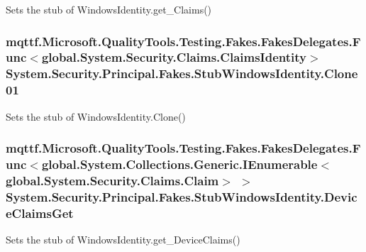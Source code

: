 Sets the stub of Windows\-Identity.\-get\-\_\-\-Claims()

\hypertarget{class_system_1_1_security_1_1_principal_1_1_fakes_1_1_stub_windows_identity_ac09e81aa53837049871a8ca89b96f598}{
\subsubsection[{Clone01}]{\setlength{\rightskip}{0pt plus 5cm}mqttf.\-Microsoft.\-Quality\-Tools.\-Testing.\-Fakes.\-Fakes\-Delegates.\-Func$<$global.\-System.\-Security.\-Claims.\-Claims\-Identity$>$ System.\-Security.\-Principal.\-Fakes.\-Stub\-Windows\-Identity.\-Clone01}}\label{class_system_1_1_security_1_1_principal_1_1_fakes_1_1_stub_windows_identity_ac09e81aa53837049871a8ca89b96f598}


Sets the stub of Windows\-Identity.\-Clone()

\hypertarget{class_system_1_1_security_1_1_principal_1_1_fakes_1_1_stub_windows_identity_a86a500a19a793982ee7402b3996a89e4}{
\subsubsection[{Device\-Claims\-Get}]{\setlength{\rightskip}{0pt plus 5cm}mqttf.\-Microsoft.\-Quality\-Tools.\-Testing.\-Fakes.\-Fakes\-Delegates.\-Func$<$global.\-System.\-Collections.\-Generic.\-I\-Enumerable$<$global.\-System.\-Security.\-Claims.\-Claim$>$ $>$ System.\-Security.\-Principal.\-Fakes.\-Stub\-Windows\-Identity.\-Device\-Claims\-Get}}\label{class_system_1_1_security_1_1_principal_1_1_fakes_1_1_stub_windows_identity_a86a500a19a793982ee7402b3996a89e4}


Sets the stub of Windows\-Identity.\-get\-\_\-\-Device\-Claims()

